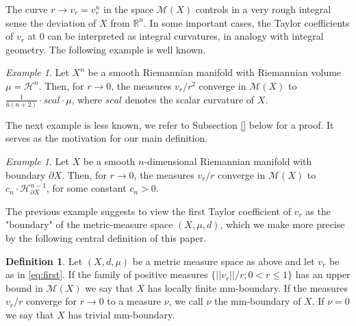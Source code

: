 \documentclass[12pt,leqno]{amsart}
\numberwithin{equation}{section}
\theoremstyle{definition}
\newtheorem{defn}[thm]{Definition}%
\theoremstyle{remark}
\newtheorem{ex}[thm]{Example}
\newcommand{\R}{\mathbb{R}}
\begin{document}
 The curve $r\to  v_r=v_r ^n$ in the space $\mathcal M(X)$  controls in a very rough integral sense the deviation of $X$ from $\R^n$.
 In some important cases, the Taylor coefficients of $v_r$ at $0$ can be interpreted as
 integral curvatures, in analogy with integral geometry. The following  example is well known.



    \begin{ex} \label{smoothscal}
 Let $X^n$ be a  smooth Riemannian manifold with  Riemannian volume $\mu =\mathcal H^n$.  Then, for $r\to 0$,
  the measures $v_r /r^2$ converge in $\mathcal M(X)$ to $\frac 1 {6(n+2)}\cdot scal \cdot \mu$, where
  $scal$ denotes the scalar curvature of $X$.
\end{ex}



The next example is less known, we refer to Subsection \ref{} below for a proof.  It serves as the  motivation for our main definition.



  \begin{ex} \label{mainex}
Let $X$ be a smooth $n$-dimensional Riemannian manifold with boundary $\partial X$.
Then, for $r\to 0$, the measures   $v_r/r$  converge in $\mathcal M(X)$ to
$c_n \cdot \mathcal H^{n-1} _{\partial X}$, for some constant $c_n >0$.
\end{ex}

The previous example  suggests  to view the first Taylor coefficient of $v_r$   as the "boundary" of the metric-measure space $(X,\mu,d)$,
 which we make more precise by the following central definition of this paper.

  \begin{defn}
  Let $(X,d,\mu)$ be a metric measure space as above and let  $v_r$ be as in \eqref{eq:first}. If the  family of positive measures $\{|| v_r ||  /r ;  0<r\leq  1 \} $   has an upper bound
	in $\mathcal M( X)$ we say that $X$ has   locally finite mm-boundary.
  If the measures $v_r /r$  converge for $r\to 0$ to a measure $\nu$, we call $\nu$ the mm-boundary of $X$.  If $\nu =0$ we say that $X$ has trivial mm-boundary.
  \end{defn}
\end{document}
